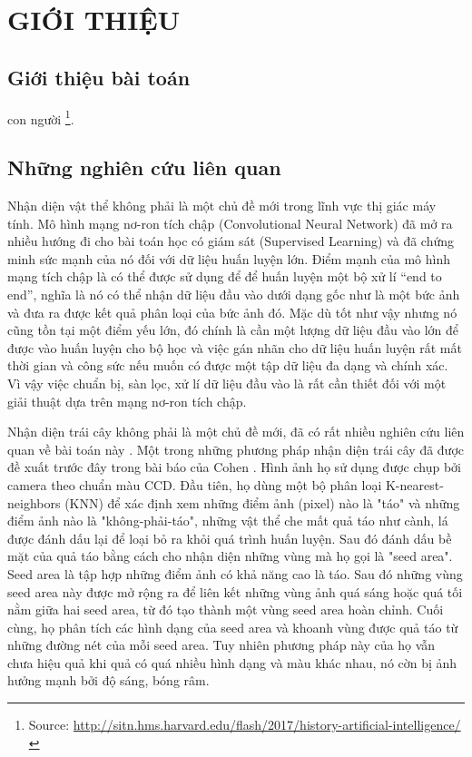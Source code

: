 \chapter{GIỚI THIỆU}
\label{introduction}
\section{Giới thiệu bài toán}
 con người \footnote{Source: \url{http://sitn.hms.harvard.edu/flash/2017/history-artificial-intelligence/}}.

\section{Những nghiên cứu liên quan}
Nhận diện vật thể không phải là một chủ đề mới trong lĩnh vực thị giác máy tính. Mô hình mạng nơ-ron tích chập (Convolutional Neural Network) đã mở ra nhiều hướng đi cho bài toán học có giám sát (Supervised Learning) và đã chứng minh sức mạnh của nó đối với dữ liệu huấn luyện lớn. Điểm mạnh của mô hình mạng tích chập là có thể được sử dụng để để huấn luyện một bộ xử lí “end to end”, nghĩa là nó có thể nhận dữ liệu đầu vào dưới dạng gốc như là một bức ảnh và đưa ra được kết quả phân loại của bức ảnh đó. Mặc dù tốt như vậy nhưng nó cũng tồn tại một điểm yếu lớn, đó chính là cần một lượng dữ liệu đầu vào lớn để được vào huấn luyện cho bộ học và việc gán nhãn cho dữ liệu huấn luyện rất mất thời gian và công sức nếu muốn có được một tập dữ liệu đa dạng và chính xác. Vì vậy việc chuẩn bị, sàn lọc, xử lí dữ liệu đầu vào là rất cần thiết đối với một giải thuật dựa trên mạng nơ-ron tích chập.


Nhận diện trái cây không phải là một chủ đề mới, đã có rất nhiều nghiên cứu liên quan về bài toán này \cite{bargoti2017image} \cite{sa2016deepfruits}. Một trong những phương pháp nhận diện trái cây đã được đề xuất trước đây trong bài báo của Cohen \cite{cohen2010estimation}. Hình ảnh họ sử dụng được chụp bởi camera theo chuẩn màu CCD. Đầu tiên, họ dùng một bộ phân loại K-nearest-neighbors (KNN) để xác định xem những điểm ảnh (pixel) nào là "táo" và những điểm ảnh nào là "không-phải-táo", những vật thể che mất quả táo như cành, lá được đánh dấu lại để loại bỏ ra khỏi quá trình huấn luyện. Sau đó đánh dấu bề mặt  của quả táo bằng cách cho nhận diện những vùng mà họ gọi là "seed area". Seed area là tập hợp những điểm ảnh có khả năng cao là táo. Sau đó những vùng seed area này được mở rộng ra để liên kết những vùng ảnh quá sáng hoặc quá tối nằm giữa hai seed area, từ đó tạo thành một vùng seed area hoàn chỉnh. Cuối cùng, họ phân tích các hình dạng của seed area và khoanh vùng được quả táo từ những đường nét của mỗi seed area. Tuy nhiên phương pháp này của họ vẫn chưa hiệu quả khi quả có quá nhiều hình dạng và màu khác nhau, nó cờn bị ảnh hưởng mạnh bởi độ sáng, bóng râm.

